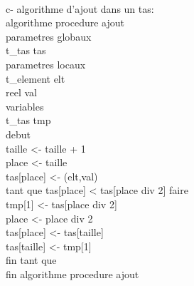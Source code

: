 \documentclass [11pt]{report}
\begin{document}
\vspace{5mm}\\
 c- algorithme d'ajout dans un tas:\\
algorithme procedure ajout\\
\indent parametres globaux\\
\indent \indent t\_tas tas\\
\indent parametres locaux\\
\indent \indent t\_element elt\\
\indent \indent reel val\\
\indent variables\\
\indent \indent t\_tas tmp\\
debut\\
\indent taille <- taille + 1\\
\indent place <- taille\\
\indent tas[place] <- (elt,val)\\
\indent tant que tas[place] < tas[place div 2] faire\\
\indent \indent tmp[1] <- tas[place div 2]\\
\indent \indent place <- place div 2\\
\indent \indent tas[place] <- tas[taille]\\
\indent \indent tas[taille] <- tmp[1]\\
\indent  fin tant que\\
fin algorithme procedure ajout\\
\end{document}
